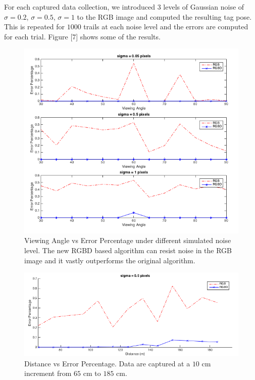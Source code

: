 For each captured data collection, we introduced 3 levels of Gaussian noise of $\sigma = 0.2$, $\sigma = 0.5$, $\sigma = 1$  to the RGB image and computed the resulting tag pose. This is repeated for $1000$ trails at each noise level and the errors are computed for each trial. Figure [7] shows some of the results. 
\begin{figure}
\centering
\includegraphics[width=\columnwidth]{figs/viewing_angle_fig1}
\caption{Viewing Angle vs Error Percentage under different simulated noise level. The new RGBD based algorithm can resist noise in the RGB image and it vastly outperforms the original algorithm.}
\end{figure}

\begin{figure}
\centering
\includegraphics[width=\columnwidth]{figs/distance_fig1}
\caption{Distance vs Error Percentage. Data are captured at a $10$ cm increment from $65$ cm to $185$ cm.}
\label{fig:distance_result}
\end{figure}

